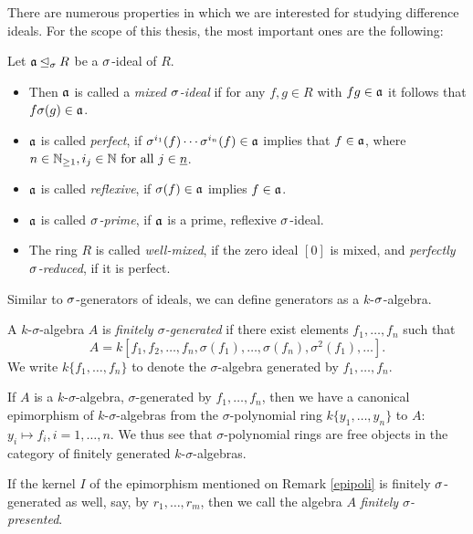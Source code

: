 \indent There are numerous properties in which we are interested for studying difference ideals. For the scope of this thesis, the most important ones are the following:
\begin{defn}
Let  $\mathfrak{a} \unlhd_{\sigma} R$ be a $\sigma$-ideal of $R$. 
\begin{itemize}
\item Then $\mathfrak{a}$ is called a \emph{mixed $\sigma$-ideal} if for any $f,g \in R$ with $fg \in \mathfrak{a}$ it follows that $f \sigma(g) \in \mathfrak{a}$. 
\item $\mathfrak{a}$ is called \emph{perfect}, if $\sigma^{i_1}(f) \cdots \sigma^{i_n}(f) \in \mathfrak{a}$ implies that $f \in \mathfrak{a}$, where $n \in \mathbb{N}_{\geq1}, i_j \in \mathbb{N} \text{ for all } j \in \underline{n}$. 
\item $\mathfrak{a}$ is called \emph{reflexive}, if $\sigma(f) \in \mathfrak{a}$ implies $f \in \mathfrak{a}$. 
\item $\mathfrak{a}$ is called \emph{$\sigma$-prime}, if $\mathfrak{a}$ is a prime, reflexive $\sigma$-ideal. 
\item The ring $R$ is called \emph{well-mixed}, if the zero ideal $[0]$ is mixed, and \emph{perfectly $\sigma$-reduced}, if it is perfect. 
\end{itemize}
\end{defn}

Similar to $\sigma$-generators of ideals, we can define generators as a $k$-$\sigma$-algebra.

\begin{defn}
A $k$-$\sigma$-algebra  $A$ is \emph{finitely $\sigma$-generated} if there exist elements $f_1, \ldots, f_n$ such that $$A = k[f_1,f_2,\ldots,f_n,\sigma(f_1),\ldots,\sigma(f_n),\sigma^2(f_1),\ldots].$$
We write  $k\{f_1, \ldots, f_n\}$ to denote the  $\sigma$-algebra generated by $f_1, \ldots, f_n$.
\end{defn}

\begin{rem}\label{epipoli}
If $A$ is a $k$-$\sigma$-algebra, $\sigma$-generated by $f_1, \ldots, f_n$, then we have a canonical epimorphism of $k$-$\sigma$-algebras from the $\sigma$-polynomial ring $k\{y_1, \ldots, y_n \}$ to $A$: $y_i \mapsto f_i, i = 1, \ldots, n$. We thus see that $\sigma$-polynomial rings are free objects in the category of finitely generated $k$-$\sigma$-algebras. 
\end{rem}

\begin{defn}
If the kernel $I$ of the epimorphism mentioned on Remark \ref{epipoli} is finitely $\sigma$-generated as well, say, by $r_1, \ldots, r_m$, then we call the algebra $A$ \emph{finitely $\sigma$-presented}. 
\end{defn}

